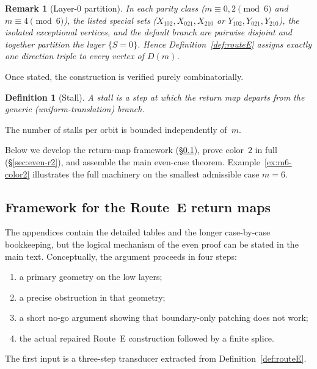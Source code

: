 \documentclass[11pt]{article}
\newtheorem{definition}{Definition}
\newtheorem{remark}{Remark}
\begin{document}
\begin{remark}[Layer-$0$ partition]\label{rem:layer0-partition}
In each parity class ($m\equiv 0,2\pmod 6$ and $m\equiv 4\pmod 6$), the listed special sets ($X_{102},X_{021},X_{210}$ or $Y_{102},Y_{021},Y_{210}$), the isolated exceptional vertices, and the default branch are pairwise disjoint and together partition the layer $\{S=0\}$.
Hence Definition~\ref{def:routeE} assigns exactly one direction triple to every vertex of $D(m)$.
\end{remark}

Once stated, the construction is verified purely combinatorially.

\begin{definition}[Stall]\label{def:stall}
A \emph{stall} is a step at which the return map departs from the generic (uniform-translation) branch.
\end{definition}

\noindent
The number of stalls per orbit is bounded independently of~$m$.

Below we develop the return-map framework (\S\ref{sec:framework}), prove color~$2$ in full (\S\ref{sec:even-r2}), and assemble the main even-case theorem.
Example~\ref{ex:m6-color2} illustrates the full machinery on the smallest admissible case $m=6$.

\subsection{Framework for the Route~E return maps}\label{sec:framework}

The appendices contain the detailed tables and the longer case-by-case bookkeeping, but the logical mechanism of the even proof can be stated in the main text.
Conceptually, the argument proceeds in four steps:
\begin{enumerate}[label=\textup{(\roman*)},leftmargin=2.5em]
\item a primary geometry on the low layers;
\item a precise obstruction in that geometry;
\item a short no-go argument showing that boundary-only patching does not work;
\item the actual repaired Route~E construction followed by a finite splice.
\end{enumerate}
The first input is a three-step transducer extracted from Definition~\ref{def:routeE}.
\end{document}
